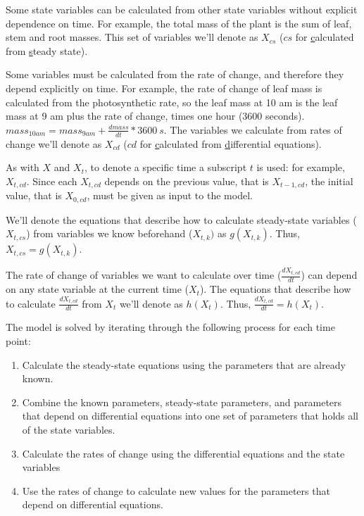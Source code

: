 \documentclass{article}
\begin{document}
Some state variables can be calculated from other state variables without explicit dependence on time. For example, the total mass of the plant is the sum of leaf, stem and root masses.  This set of variables we'll denote as $X_{cs}$ ($cs$  for \underline{c}alculated from \underline{s}teady state). 

Some variables must be calculated from the rate of change, and therefore they depend explicitly on time. For example, the rate of change of leaf mass is calculated from the photosynthetic rate, so the leaf mass at 10 am is the leaf mass at 9 am plus the rate of change, times one hour (3600 seconds).  $mass_{10am} = mass_{9am} + \frac{dmass}{dt} * \SI{3600}{s}$. The variables we calculate from rates of change we'll denote as $X_{cd}$ ($cd$ for \underline{c}alculated from \underline{d}ifferential equations).

As with $X$ and $X_t$, to denote a specific time a subscript $t$ is used: for example, $X_{t, cd}$. Since each $X_{t,cd}$ depends on the previous value, that is $X_{t-1, cd}$, the initial value, that is $X_{0, cd}$, must be given as input to the model.

We'll denote the equations that describe how to calculate steady-state variables ($X_{t,cs}$) from variables we know beforehand ($X_{t,k})$ as $g(X_{t,k})$. Thus, $X_{t,cs} = g(X_{t,k})$.
% 
% 
% 
% 

The rate of change of variables we want to calculate over time ($\frac{dX_{t,cd}}{dt}$) can depend on any state variable at the current time ($X_{t}$). The equations that describe how to calculate $\frac{dX_{t,cd}}{dt}$ from $X_{t}$ we'll denote as $h(X_{t})$. Thus, $\frac{dX_{t,cd}}{dt} = h(X_{t})$.

The model is solved by iterating through the following process for each time point:
\begin{center}
\begin{enumerate}
\item Calculate the steady-state equations using the parameters that are already known.
\item Combine the known parameters, steady-state parameters, and parameters that depend on differential equations into one set of parameters that holds all of the state variables.
\item Calculate the rates of change using the differential equations and the state variables
\item Use the rates of change to calculate new values for the parameters that depend on differential equations.
\end{enumerate}
\end{center}
\end{document}
